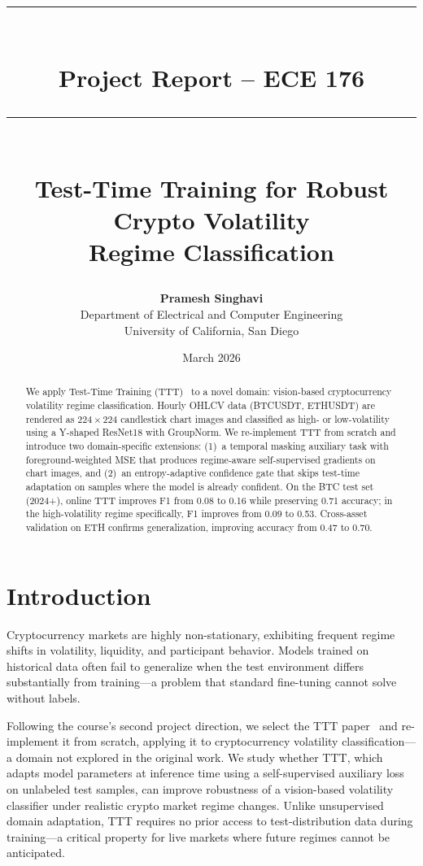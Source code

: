 \documentclass[11pt]{article}
\title{%
  \vspace{-1.5em}
  \rule{\linewidth}{2pt}\\[0.4em]
  {\LARGE Project Report -- ECE 176}\\[0.3em]
  \rule{\linewidth}{2pt}\\[1em]
  {\Large Test-Time Training for Robust Crypto Volatility\\Regime Classification}
}
\author{%
  \textbf{Pramesh Singhavi}\\
  Department of Electrical and Computer Engineering\\
  University of California, San Diego
}
\date{March 2026}
\begin{document}
\maketitle
\thispagestyle{empty}

\begin{abstract}
We apply Test-Time Training (TTT)~\cite{sun2020ttt} to a novel domain: vision-based
cryptocurrency volatility regime classification. Hourly OHLCV data (BTCUSDT, ETHUSDT)
are rendered as $224\!\times\!224$ candlestick chart images and classified as high- or
low-volatility using a Y-shaped ResNet18 with GroupNorm. We re-implement TTT from
scratch and introduce two domain-specific extensions: (1)~a temporal masking auxiliary
task with foreground-weighted MSE that produces regime-aware self-supervised gradients on
chart images, and (2)~an entropy-adaptive confidence gate that skips test-time adaptation
on samples where the model is already confident. On the BTC test set (2024+), online TTT
improves F1 from 0.08 to 0.16 while preserving 0.71 accuracy; in the high-volatility
regime specifically, F1 improves from 0.09 to 0.53. Cross-asset validation on ETH
confirms generalization, improving accuracy from 0.47 to 0.70.
\end{abstract}

\section{Introduction}
\label{sec:intro}

Cryptocurrency markets are highly non-stationary, exhibiting frequent regime shifts in
volatility, liquidity, and participant behavior. Models trained on historical data often
fail to generalize when the test environment differs substantially from training---a
problem that standard fine-tuning cannot solve without labels.

Following the course's second project direction, we select the TTT paper~\cite{sun2020ttt}
and re-implement it from scratch, applying it to cryptocurrency volatility
classification---a domain not explored in the original work. We study whether TTT, which
adapts model parameters at inference time using a self-supervised auxiliary loss on
unlabeled test samples, can improve robustness of a vision-based volatility classifier
under realistic crypto market regime changes. Unlike unsupervised domain adaptation, TTT
requires no prior access to test-distribution data during training---a critical property
for live markets where future regimes cannot be anticipated.
\end{document}
